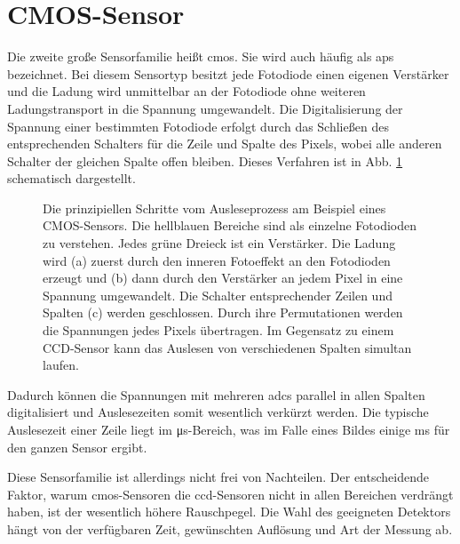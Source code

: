 \section{CMOS-Sensor}
\label{text:cmos_theorie}
Die zweite große Sensorfamilie heißt \gls{cmos}. Sie wird auch häufig als \gls{aps} bezeichnet. Bei diesem Sensortyp besitzt jede Fotodiode einen eigenen Verstärker und die Ladung wird unmittelbar an der Fotodiode ohne weiteren Ladungstransport in die Spannung umgewandelt. Die Digitalisierung der Spannung einer bestimmten Fotodiode erfolgt durch das Schließen des entsprechenden Schalters für die Zeile und Spalte des Pixels, wobei alle anderen Schalter der gleichen Spalte offen bleiben. Dieses Verfahren ist in Abb. \ref{fig:cmos_scheme} schematisch dargestellt.
\begin{figure}[H]
    
    \caption{Die prinzipiellen Schritte vom Ausleseprozess am Beispiel eines  CMOS-Sensors. Die hellblauen Bereiche sind als einzelne Fotodioden zu verstehen. Jedes grüne Dreieck ist ein Verstärker. Die Ladung wird (a) zuerst durch den inneren Fotoeffekt an den Fotodioden erzeugt und (b) dann durch den Verstärker an jedem Pixel in eine Spannung umgewandelt. Die Schalter entsprechender Zeilen und Spalten (c) werden geschlossen. Durch ihre Permutationen werden die Spannungen jedes Pixels übertragen. Im Gegensatz zu einem CCD-Sensor kann das Auslesen von verschiedenen Spalten simultan laufen.}
    \label{fig:cmos_scheme}
\end{figure}
\noindent
Dadurch können die Spannungen mit mehreren \gls{adc}s parallel in allen Spalten digitalisiert und Auslesezeiten somit wesentlich verkürzt werden. Die typische Auslesezeit einer Zeile liegt im \si{\micro\second}-Bereich, was im Falle eines  Bildes einige \si{\milli\second} für den ganzen Sensor ergibt.

\noindent
Diese Sensorfamilie ist allerdings nicht frei von Nachteilen. Der entscheidende Faktor, warum \gls{cmos}-Sensoren die \gls{ccd}-Sensoren nicht in allen Bereichen verdrängt haben, ist der wesentlich höhere Rauschpegel. Die Wahl des geeigneten Detektors hängt von der verfügbaren Zeit, gewünschten Auflösung und Art der Messung ab.

